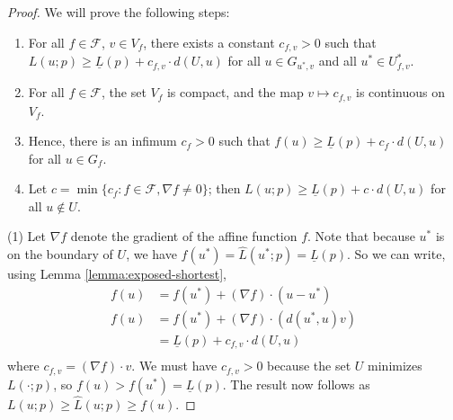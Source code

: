 \documentclass[11pt]{article}
\newcommand{\Comments}{1}
\newcommand{\mynote}[2]{\ifnum\Comments=1\textcolor{#1}{#2}\fi}
\newcommand{\bo}[1]{\mynote{blue}{[Bo: #1]}}
\newcommand{\F}{\mathcal{F}}
\newcommand{\risk}[1]{\underline{#1}}
\begin{document}
\begin{proof}
  We will prove the following steps:
  \begin{enumerate}
    \item For all $f\in\F$, $v\in V_f$, there exists a constant $c_{f,v} > 0$ such that $L(u;p) \geq \risk{L}(p) + c_{f,v} \cdot d(U,u)$ for all $u \in G_{u^*,v}$ and all $u^*\in U^*_{f,v}$.
    \item For all $f\in \F$, the set $V_f$ is compact, and the map $v \mapsto c_{f,v}$ is continuous on $V_f$.
    \item Hence, there is an infimum $c_f > 0$ such that $f(u) \geq \risk{L}(p) + c_f \cdot d(U,u)$ for all $u\in G_f$.
    \item Let $c = \min \{c_f : f\in\F, \nabla f \neq 0\}$; then $L(u;p) \geq \risk{L}(p) + c \cdot d(U,u)$ for all $u \not\in U$.
  \end{enumerate}


  (1) Let $\nabla f$ denote the gradient of the affine function $f$.
  Note that because $u^*$ is on the boundary of $U$, we have $f(u^*) = \hat{L}(u^*;p) = \risk{L}(p)$.
  So we can write, using Lemma \ref{lemma:exposed-shortest},
  \begin{align*}
    f(u) &= f(u^*) + (\nabla f)\cdot (u - u^*)  \\
    f(u) &= f(u^*) + (\nabla f)\cdot (d(u^*,u) v)  \\
         &= \risk{L}(p) + c_{f,v} \cdot d(U,u)  \\
  \end{align*}
  where $c_{f,v} = (\nabla f)\cdot v$.
  We must have $c_{f,v} > 0$ because the set $U$ minimizes $L(\cdot;p)$, so $f(u) > f(u^*) = \risk{L}(p)$.
  The result now follows as $L(u;p) \geq \hat L(u;p) \geq f(u)$.


\end{proof}
\end{document}
